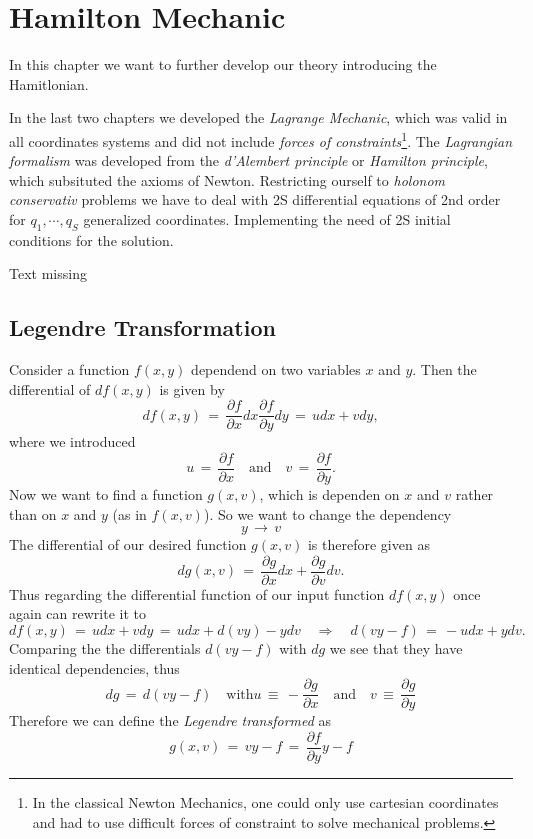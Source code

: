 \chapter{Hamilton Mechanic}
In this chapter we want to further develop our theory introducing the
Hamitlonian.

In the last two chapters we developed the \textit{Lagrange Mechanic}, which was
valid in all coordinates systems and did not include \textit{forces of
constraints}\footnote{In the classical Newton Mechanics, one could only use
cartesian coordinates and had to use difficult forces of constraint to solve
mechanical problems.}. The \textit{Lagrangian formalism} was developed from the
\textit{d'Alembert principle} or \textit{Hamilton principle}, which subsituted
the axioms of Newton. Restricting ourself to \textit{holonom conservativ}
problems we have to deal with 2S differential equations of 2nd order for $q_1,
\cdots, q_S$ generalized coordinates. Implementing the need of 2S initial
conditions for the solution. 

Text missing
\section{Legendre Transformation}
Consider a function $f(x, y)$ dependend on two variables $x$ and $y$. Then the
differential of $df(x,y)$ is given by
\begin{equation}
  df(x,y) \,=\, \frac{\partial f}{\partial x} dx \frac{\partial f}{\partial y}
dy \,=\, udx + vdy,
\end{equation}
where we introduced
\begin{equation}
  u \,=\, \frac{\partial f}{\partial x} \quad \text{and} \quad v \,=\,
\frac{\partial f}{\partial y}.
\end{equation}
Now we want to find a function $g(x,v)$, which is dependen on $x$ and $v$
rather than on $x$ and $y$ (as in $f(x,v)$). So we want to change the
dependency
\begin{equation}
  y \,\to\, v 
\end{equation}
The differential of our desired function $g(x, v)$ is therefore given as
\begin{equation}
  dg(x,v) \,=\, \frac{\partial g}{\partial x} dx + \frac{\partial g}{\partial
v} dv.
\end{equation}
Thus regarding the differential function of our input function $df(x,y)$ once
again can rewrite it to 
\begin{equation}
  df(x, y) \,=\, udx + vdy \,=\, udx + d(vy) - ydv \quad \Rightarrow \quad d(vy
 - f) \,=\, - udx + ydv.
\end{equation}
Comparing the the differentials $d(vy -f)$ with $dg$ we see that they
have identical dependencies, thus
\begin{equation}
  dg \,=\, d(vy - f) \quad \text{with} u \,\equiv\, - \frac{\partial
g}{\partial x} \quad \text{and} \quad v \,\equiv\, \frac{\partial g}{\partial y}  
\end{equation}
Therefore we can define the \textit{Legendre transformed} as
\begin{equation}
  g(x, v) \,=\, vy - f \,=\, \frac{\partial f}{\partial y} y - f
\end{equation}

